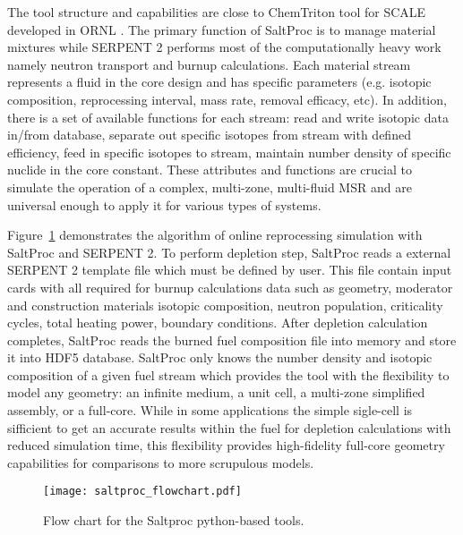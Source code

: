 The tool structure and capabilities are close to ChemTriton tool for SCALE developed in \gls{ORNL} \cite{powers_new_2013}. The primary function of SaltProc is to manage material mixtures while SERPENT 2 performs most of the computationally heavy work namely neutron transport and burnup calculations. Each material stream represents a fluid in the core design and has specific parameters (e.g. isotopic composition, reprocessing interval, mass rate, removal efficacy, etc). In addition, there is a set of available functions for each stream: read and write isotopic data in/from database, separate out specific isotopes from stream with defined efficiency, feed in specific isotopes to stream, maintain number density of specific nuclide in the core constant. These attributes and functions are crucial to simulate the operation of a complex, multi-zone, multi-fluid \gls{MSR} and are universal enough to apply it for various types of systems.

Figure~\ref{fig:saltproc_flow} demonstrates the algorithm of online reprocessing simulation with SaltProc and SERPENT 2. To perform depletion step, SaltProc reads a external SERPENT 2 template file which must be defined by user. This file contain input cards with all required for burnup calculations data such as geometry, moderator and construction materials isotopic composition, neutron population, criticality cycles, total heating power, boundary conditions. After depletion calculation completes, SaltProc reads the burned fuel composition file into memory and store it into HDF5 database. SaltProc only knows the number density and isotopic composition of a given fuel stream which provides the tool with the flexibility to model any geometry: an infinite medium, a unit cell, a multi-zone simplified assembly, or a full-core. While in some applications the simple sigle-cell is sifficient to get an accurate results within the fuel for depletion calculations with reduced simulation time, this flexibility provides high-fidelity full-core geometry capabilities for comparisons to more scrupulous models.

\begin{figure}[htp!] %
  \centering
  \vspace{-0.3em}
  \texttt{[image: saltproc\_flowchart.pdf]}
  \caption{Flow chart for the Saltproc python-based tools.}
  \vspace{-0.6em}
  \label{fig:saltproc_flow}
\end{figure}
\FloatBarrier

